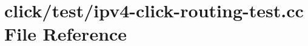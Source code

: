 \hypertarget{ipv4-click-routing-test_8cc}{}\section{click/test/ipv4-\/click-\/routing-\/test.cc File Reference}
\label{ipv4-click-routing-test_8cc}

